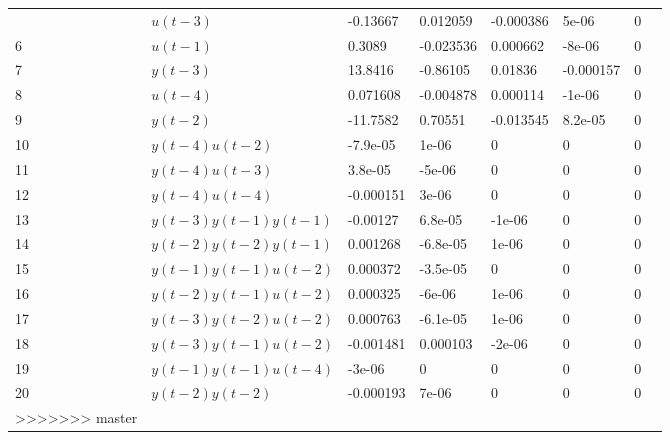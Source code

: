 \begin{tabular}{llllllll}
\begin{tabular}{lllllll}
5 & $u(t-3)$ & -0.13667 & 0.012059 & -0.000386 & 5e-06 & 0 \\ 
6 & $u(t-1)$ & 0.3089 & -0.023536 & 0.000662 & -8e-06 & 0 \\ 
7 & $y(t-3)$ & 13.8416 & -0.86105 & 0.01836 & -0.000157 & 0 \\ 
8 & $u(t-4)$ & 0.071608 & -0.004878 & 0.000114 & -1e-06 & 0 \\ 
9 & $y(t-2)$ & -11.7582 & 0.70551 & -0.013545 & 8.2e-05 & 0 \\ 
10 & $y(t-4)u(t-2)$ & -7.9e-05 & 1e-06 & 0 & 0 & 0 \\ 
11 & $y(t-4)u(t-3)$ & 3.8e-05 & -5e-06 & 0 & 0 & 0 \\ 
12 & $y(t-4)u(t-4)$ & -0.000151 & 3e-06 & 0 & 0 & 0 \\ 
13 & $y(t-3)y(t-1)y(t-1)$ & -0.00127 & 6.8e-05 & -1e-06 & 0 & 0 \\ 
14 & $y(t-2)y(t-2)y(t-1)$ & 0.001268 & -6.8e-05 & 1e-06 & 0 & 0 \\ 
15 & $y(t-1)y(t-1)u(t-2)$ & 0.000372 & -3.5e-05 & 0 & 0 & 0 \\ 
16 & $y(t-2)y(t-1)u(t-2)$ & 0.000325 & -6e-06 & 1e-06 & 0 & 0 \\ 
17 & $y(t-3)y(t-2)u(t-2)$ & 0.000763 & -6.1e-05 & 1e-06 & 0 & 0 \\ 
18 & $y(t-3)y(t-1)u(t-2)$ & -0.001481 & 0.000103 & -2e-06 & 0 & 0 \\ 
19 & $y(t-1)y(t-1)u(t-4)$ & -3e-06 & 0 & 0 & 0 & 0 \\ 
20 & $y(t-2)y(t-2)$ & -0.000193 & 7e-06 & 0 & 0 & 0 \\ 
>>>>>>> master
\hline 
\end{tabular}